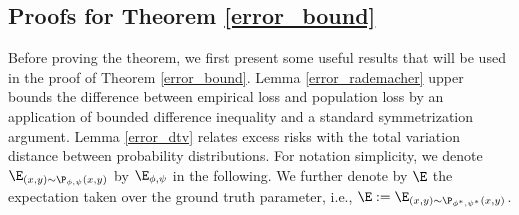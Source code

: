 \subsection{Proofs for Theorem \ref{error_bound}}\label{main2}
Before proving the theorem, we first present some useful results that will be used in the proof of Theorem \ref{error_bound}. Lemma \ref{error_rademacher} upper bounds the difference between empirical loss and population loss by an application of bounded difference inequality and a standard symmetrization argument. Lemma \ref{error_dtv} relates excess risks with the total variation distance between probability distributions. For notation simplicity, we denote $\E_{(x,y)\sim\P_{\phi,\psi}(x,y)}$ by $\E_{\phi,\psi}$ in the following. We further denote by $\E$ the expectation taken over the  ground truth parameter, i.e., $\E:=\E_{(x,y)\sim\P_{\phi^* ,\psi^* }(x,y)}$.

